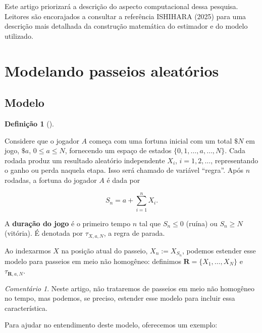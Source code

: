 \documentclass[
  brazilian,
  12pt,
]{article}
\theoremstyle{definition}
\newtheorem{definition}{Definição}[section]
\theoremstyle{definition}
\theoremstyle{remark}
\newtheorem{refremark}{Comentário}[section]
\begin{document}
Este artigo priorizará a descrição do aspecto computacional dessa
pesquisa. Leitores são encorajados a consultar a referência ISHIHARA
(2025) para uma descrição mais detalhada da construção matemática do
estimador e do modelo utilizado.

\section{Modelando passeios
aleatórios}\label{modelando-passeios-aleatuxf3rios}

\subsection{Modelo}\label{modelo}

\begin{definition}[]\protect\hypertarget{def-modelodiscreto}{}\label{def-modelodiscreto}

Considere que o jogador \(A\) começa com uma fortuna inicial com um
total \(\$N\) em jogo, \(\$a\), \(0 \leq a \leq N\), fornecendo um
espaço de estados \(\{0, 1, \dots, a, \dots, N\}\). Cada rodada produz
um resultado aleatório independente \(X_i\), \(i=1,2,\dots\),
representando o ganho ou perda naquela etapa. Isso será chamado de
variável ``regra''. Após \(n\) rodadas, a fortuna do jogador \(A\) é
dada por

\[
S_n = a + \sum_{i=1}^n X_i.
\]

A \textbf{duração do jogo} é o primeiro tempo \(n\) tal que
\(S_n \leq 0\) (ruína) ou \(S_n \geq N\) (vitória). É denotada por
\(\tau_{X, a, N}\), a regra de parada.

Ao indexarmos \(X\) na posição atual do passeio, \(X_{n} := X_{S_n}\),
podemos estender esse modelo para passeios em meio não homogêneo:
definimos \(\pmb{R} =
\{X_1, \dots, X_N\}\) e \(\tau_{\pmb{R}, a, N}\).

\end{definition}

\begin{refremark}
Neste artigo, não trataremos de passeios em meio não homogêneo no tempo,
mas podemos, se preciso, estender esse modelo para incluir essa
característica.

\label{rem-tempo}

\end{refremark}

Para ajudar no entendimento deste modelo, oferecemos um exemplo:
\end{document}
